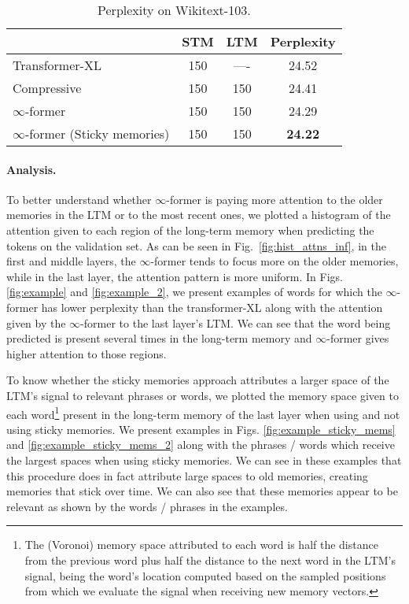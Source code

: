 \documentclass[11pt]{article}
\begin{document}
\begin{table}[t]
\vspace{\baselineskip}
\centering \small
\setlength{\tabcolsep}{1ex}
\begin{tabular}{lccc}
\toprule
& STM & LTM & Perplexity \\
\midrule
Transformer-XL & 150 & ---- & 24.52 \\
Compressive & 150 & 150 & 24.41 \\
$\infty$-former & 150 & 150 & 24.29 \\
$\infty$-former (Sticky memories) & 150 & 150 & \textbf{24.22} \\
\bottomrule
\end{tabular}
\caption{Perplexity on Wikitext-103. }
\label{table:wt-103}
\end{table}

\paragraph{Analysis. }
\label{sec:analysis_lm}


To better understand whether $\infty$-former is paying more attention to the older memories in the LTM or to the most recent ones, we plotted a histogram of the attention given to each region of the long-term memory when predicting the tokens on the validation set. As can be seen in Fig.~\ref{fig:hist_attns_inf}, in the first  and middle layers, the $\infty$-former tends to focus more on the older memories, while in the last layer, the attention pattern is more uniform. 
In Figs. \ref{fig:example} and \ref{fig:example_2}, we present examples of words for which the $\infty$-former has lower perplexity than the transformer-XL along with the attention given by the $\infty$-former to the last layer's LTM. We can see that the word being predicted is present several times in the long-term memory and $\infty$-former gives higher attention to those regions.

To know whether the sticky memories approach attributes a larger space of the LTM's signal to relevant phrases or words, we plotted the memory space given to each word\footnote{The (Voronoi) memory space attributed to each word is half the distance from the previous word plus half the distance to the next word in the LTM's signal, being the word's location computed based on the sampled positions from which we evaluate the signal when receiving new memory vectors.} 
present in the long-term memory of the last layer when using and not using sticky memories. We present examples in Figs. \ref{fig:example_sticky_mems} and \ref{fig:example_sticky_mems_2} along with the phrases / words which receive the largest spaces when using sticky memories. We can see in these examples that this procedure does in fact attribute large spaces to old memories, creating memories that stick over time. We can also see that these memories appear to be relevant as shown by the words / phrases in the examples.
\end{document}
